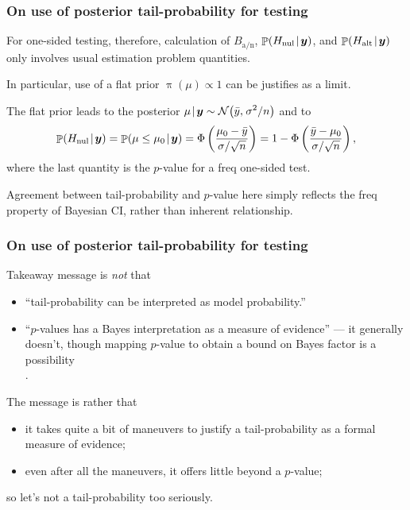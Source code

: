 \documentclass[18pt, handout]{beamer}
\newcommand{\defineTightSpacing}{%
	\setlength{\abovedisplayskip}{.25\baselineskip}%
	\setlength{\belowdisplayskip}{.25\baselineskip}%
}
\newenvironment{indented}[1][3]{%
	\hfill \begin{minipage}{\dimexpr\textwidth-#1ex} 
	}{
	\end{minipage}
}
\newenvironment{tightItemize}[1][]{%
  \vspace{-.3\baselineskip}%
  \begin{itemize}[#1]
  \addtolength\itemsep{-.1\baselineskip}
}{
  \end{itemize}
}
\newcommand{\given}{\mskip.7\thinmuskip | \mskip.7\thinmuskip}
\newcommand{\thinnerspace}{\mskip.5\thinmuskip}
\DeclareMathOperator{\probability}{\mathbb{P}}
\newcommand{\normalDist}{\operatorname{\mathcal{N}}}
\newcommand{\density}{\operatorname{\pi}}
\newcommand{\by}{\bm{y}}
\newcommand{\hypothesis}{H}
\newcommand{\nullSub}{\mathrm{nul}}
\newcommand{\altSub}{\mathrm{alt}}
\newcommand{\bayesFacAlt}{B_{\mathrm{a} / \mathrm{n}}}
\begin{document}
\begin{frame}
\frametitle{On use of posterior tail-probability for testing}
For one-sided testing, therefore, calculation of $\bayesFacAlt$, $\probability(\hypothesis_\nullSub \given \by)$, and $\probability(\hypothesis_\altSub \given \by)$ only involves usual estimation problem quantities.

In particular, use of a flat prior $\density(\mu) \propto 1$ can be justifies as a limit.

\smallskip
The flat prior leads to the posterior $\displaystyle \mu \given \by \sim \normalDist\!\left( \bar{y}, \thinnerspace \sigma^2 / n \right)$ and to
\begin{equation*} \defineTightSpacing%
\probability(\hypothesis_\nullSub \given \by)
	= \probability(\mu \leq \mu_0 \given \by) 
	= \Phi\left( \frac{\mu_0 - \bar{y}}{\sigma / \sqrt{n}} \right) 
	= 1 - \Phi\left( \frac{\bar{y} - \mu_0}{\sigma / \sqrt{n}} \right),
\end{equation*}
where the last quantity is the $p$-value for a freq one-sided test.

\smallskip
Agreement between tail-probability and $p$-value here simply reflects the freq property of Bayesian CI, rather than inherent relationship.
\end{frame}


\begin{frame}
\frametitle{On use of posterior tail-probability for testing}

Takeaway message is \textit{not} that 
\begin{tightItemize}
\item ``tail-probability can be interpreted as model probability.''
\item ``$p$-values has a Bayes interpretation as a measure of evidence'' --- it generally doesn't, though mapping $p$-value to obtain a bound on Bayes factor is a possibility\\
\hfill \citep{benjamin2019use_of_pvalue}.
\end{tightItemize}


The message is rather that 
\begin{tightItemize}
\item it takes quite a bit of maneuvers to justify a tail-probability as a formal measure of evidence;
\item even after all the maneuvers, it offers little beyond a $p$-value;
\end{tightItemize}
\vspace*{-.2\baselineskip}
so let's not a tail-probability too seriously.

%
\end{frame}
\end{document}
